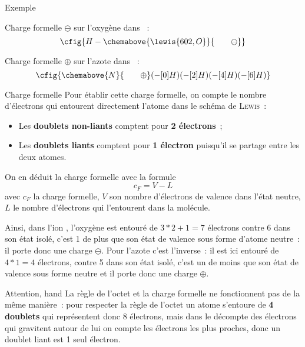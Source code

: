 \documentclass[../main/main.tex]{subfiles}
\begin{document}
\begin{rexem}{Exemple}
    \begin{minipage}[t]{0.48\linewidth}
        Charge formelle $\ominus$ sur l'oxygène dans ~:
        \vspace{1cm}
        \[
            \cfig{H-\chemabove{\lewis{602,O}}{\hspace{20pt}\ominus}}
        \]
    \end{minipage}
    \hfill
    \begin{minipage}[t]{0.48\linewidth}
        Charge formelle $\oplus$ sur l'azote dans ~:
        \[
            \cfig{
            \chemabove{N}{\hspace{20pt}\oplus}
            (-[0]H)
            (-[2]H)
            (-[4]H)
            (-[6]H)
        }
        \]
    \end{minipage}
\end{rexem}

\begin{tdefi}{Charge formelle}
    Pour établir cette charge formelle, on compte le nombre d'électrons qui
    entourent directement l'atome dans le schéma de \textsc{Lewis}~:
    \begin{itemize}
        \item Les \textbf{doublets non-liants} comptent pour \textbf{2 électrons}~;
        \item Les \textbf{doublets liants} comptent pour \textbf{1 électron}
            puisqu'il se partage entre les deux atomes.
    \end{itemize}
    On en déduit la charge formelle avec la formule
    \[\boxed{c_F = V - L}\]
    avec $c_F$ la charge formelle, $V$ son nombre d'électrons de valence dans l'état
    neutre, $L$ le nombre d'électrons qui l'entourent dans la molécule.
\end{tdefi}

Ainsi, dans l'ion , l'oxygène est entouré de $3*2+1=7$ électrons contre
6 dans son état isolé, c'est 1 de plus que son état de valence sous forme
d'atome neutre~: il porte donc une charge $\ominus$. Pour l'azote c'est
l'inverse~: il est ici entouré de $4*1=4$ électrons, contre 5 dans son état
isolé, c'est un de moins que son état de valence sous forme neutre et il porte
donc une charge $\oplus$.

\begin{timpo}{Attention, hand}
    La règle de l'octet et la charge formelle ne fonctionnent pas de la même
    manière~: pour respecter la règle de l'octet un atome s'entoure de \textbf{4
    doublets} qui représentent donc 8 électrons, mais dans le décompte des
    électrons qui gravitent autour de lui on compte les électrons les plus
    proches, donc un doublet liant est 1 seul électron.
\end{timpo}
\end{document}
